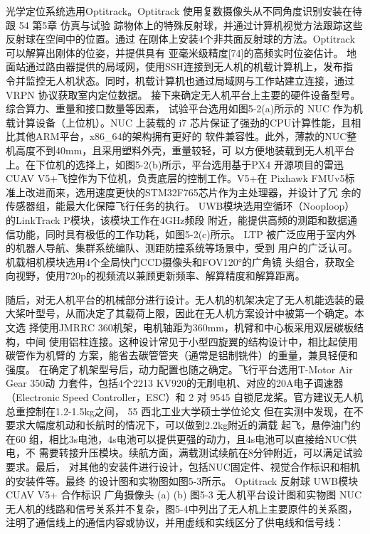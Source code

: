 \documentclass[lang=chs, degree=master, blindreview=false, winfonts=true]{yanputhesis}
\begin{document}
光学定位系统选用Optitrack。Optitrack 使用复数摄像头从不同角度识别安装在待跟
54 
第5章  仿真与试验 
踪物体上的特殊反射球，并通过计算机视觉方法跟踪这些反射球在空间中的位置。通过
在刚体上安装4个非共面反射球的方法。Optitrack可以解算出刚体的位姿，并提供具有
亚毫米级精度[74]的高频实时位姿估计。 
地面站通过路由器提供的局域网，使用SSH连接到无人机的机载计算机上，发布指
令并监控无人机状态。同时，机载计算机也通过局域网与工作站建立连接，通过VRPN
协议获取室内定位数据。 
接下来确定无人机平台上主要的硬件设备型号。综合算力、重量和接口数量等因素，
试验平台选用如图5-2(a)所示的 NUC 作为机载计算设备（上位机）。NUC 上装载的 i7
芯片保证了强劲的CPU计算性能，且相比其他ARM平台，x86_64的架构拥有更好的
软件兼容性。此外，薄款的NUC整机高度不到40mm，且采用塑料外壳，重量较轻，可
以方便地装载到无人机平台上。在下位机的选择上，如图5-2(b)所示，平台选用基于PX4
开源项目的雷迅 CUAV V5+飞控作为下位机，负责底层的控制工作。V5+在 Pixhawk 
FMUv5标准上改进而来，选用速度更快的STM32F765芯片作为主处理器，并设计了冗
余的传感器组，能最大化保障飞行任务的执行。 
UWB模块选用空循环（Nooploop）的LinkTrack P模块，该模块工作在4GHz频段
附近，能提供高频的测距和数据通信功能，同时具有极低的工作功耗，如图5-2(c)所示。
LTP 被广泛应用于室内外的机器人导航、集群系统编队、测距防撞系统等场景中，受到
用户的广泛认可。机载相机模块选用4个全局快门CCD摄像头和FOV120°的广角镜
头组合，获取全向视野，使用720p的视频流以兼顾更新频率、解算精度和解算距离。

随后，对无人机平台的机械部分进行设计。无人机的机架决定了无人机能选装的最
大桨叶型号，从而决定了其载荷上限，因此在无人机方案设计中被第一个确定。本文选
择使用JMRRC 360机架，电机轴距为360mm，机臂和中心板采用双层碳板结构，中间
使用铝柱连接。这种设计常见于小型四旋翼的结构设计中，相比起使用碳管作为机臂的
方案，能省去碳管管夹（通常是铝制铣件）的重量，兼具轻便和强度。 
在确定了机架型号后，动力配置也随之确定。飞行平台选用T-Motor Air Gear 350动
力套件，包括4个2213 KV920的无刷电机、对应的20A电子调速器（Electronic Speed 
Controller，ESC）和 2 对 9545 自锁尼龙桨。官方建议无人机总重控制在1.2-1.5kg之间，
55 
西北工业大学硕士学位论文 
但在实测中发现，在不要求大幅度机动和长航时的情况下，可以做到2.2kg附近的满载
起飞，悬停油门约在60%
组，相比3s电池，4s电池可以提供更强的动力，且4s电池可以直接给NUC供电，不
需要转接升压模块。续航方面，满载测试续航在8分钟附近，可以满足试验要求。最后，
对其他的安装件进行设计，包括NUC固定件、视觉合作标识和相机的安装件等。最终
的设计图和实物图如图5-3所示。 
Optitrack
反射球
UWB模块
CUAV V5+
合作标识
广角摄像头
(a)                                             
(b) 
图5-3 无人机平台设计图和实物图 
NUC
无人机的线路和信号关系并不复杂，图5-4中列出了无人机上主要原件的关系图，
注明了通信线上的通信内容或协议，并用虚线和实线区分了供电线和信号线：
\end{document}
